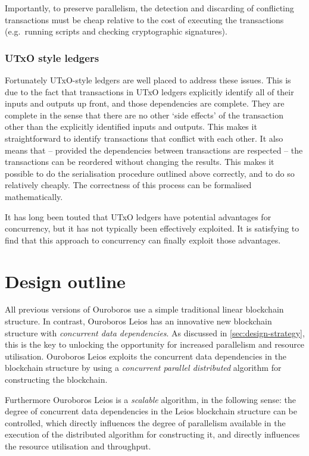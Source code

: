 \documentclass[11pt,a4paper]{article}
\begin{document}
Importantly, to preserve parallelism, the detection and discarding of
conflicting transactions must be cheap relative to the cost of executing the
transactions (e.g.~running scripts and checking cryptographic signatures).

\subsubsection{UTxO style ledgers}
Fortunately UTxO-style ledgers are well placed to address these issues. This is
due to the fact that transactions in UTxO ledgers explicitly identify all of
their inputs and outputs up front, and those dependencies are complete. They are
complete in the sense that there are no other `side effects' of the transaction
other than the explicitly identified inputs and outputs. This makes it
straightforward to identify transactions that conflict with each other. It
also means that -- provided the dependencies between transactions are respected
-- the transactions can be reordered without changing the results. This makes
it possible to do the serialisation procedure outlined above correctly, and to
do so relatively cheaply. The correctness of this process can be formalised
mathematically.

It has long been touted that UTxO ledgers have potential advantages for
concurrency, but it has not typically been effectively exploited. It is
satisfying to find that this approach to concurrency can finally exploit those
advantages.

\section{Design outline}

All previous versions of Ouroboros use a simple traditional linear blockchain
structure. In contrast, Ouroboros Leios has an innovative new blockchain
structure with \emph{concurrent data dependencies}. As discussed in
\cref{sec:design-strategy}, this is the key to unlocking the opportunity for
increased parallelism and resource utilisation. Ouroboros Leios exploits the
concurrent data dependencies in the blockchain structure by using a
\emph{concurrent parallel distributed} algorithm for constructing the
blockchain.

Furthermore Ouroboros Leios is a \emph{scalable} algorithm, in the following
sense: the degree of concurrent data dependencies in the Leios blockchain
structure can be controlled, which directly influences the degree of
parallelism available in the execution of the distributed algorithm for
constructing it, and directly influences the resource utilisation and
throughput.
\end{document}
